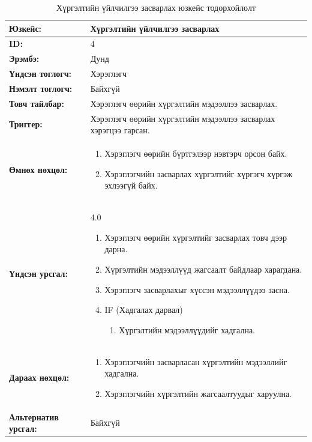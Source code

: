\begin{table}[H]
    \caption{Хүргэлтийн үйлчилгээ засварлах юзкейс тодорхойлолт}
    \begin{tabular}{|l|p{9cm}|}
		\hline
		{\bfseries Юзкейс:} & Хүргэлтийн үйлчилгээ засварлах \\\hline
		{\bfseries ID:} & 4 \\\hline
		{\bfseries Эрэмбэ:} & Дунд \\\hline
		{\bfseries Үндсэн тоглогч:} & Хэрэглэгч \\\hline
		{\bfseries Нэмэлт тоглогч:} & Байхгүй \\\hline
		{\bfseries Товч тайлбар:} & Хэрэглэгч өөрийн хүргэлтийн мэдээллээ засварлах.\\\hline
		{\bfseries Триггер:} & Хэрэглэгч өөрийн хүргэлтийн мэдээллээ засварлах хэрэгцээ гарсан. \\\hline
		{\bfseries Өмнөх нөхцөл:} &
		    \begin{enumerate}[nosep]
		        \item Хэрэглэгч өөрийн бүртгэлээр нэвтэрч орсон байх.
		        \item Хэрэглэгчийн засварлах хүргэлтийг хүргэгч хүргэж эхлээгүй байх.
		    \end{enumerate}
		\\\hline
		{\bfseries Үндсэн урсгал:} &
			4.0
			\begin{enumerate}[nosep]
			    \item Хэрэглэгч өөрийн хүргэлтийг засварлах товч дээр дарна.
			    \item Хүргэлтийн мэдээллүүд жагсаалт байдлаар харагдана.
			    \item Хэрэглэгч засварлахыг хүссэн мэдээллүүдээ засна.
				\item IF (Хадгалах дарвал)
				    \begin{enumerate}[nosep]
				        \item Хүргэлтийн мэдээллүүдийг хадгална.
				    \end{enumerate}
			\end{enumerate}
		\\\hline
		{\bfseries Дараах нөхцөл:} &
		    \begin{enumerate}[nosep]
		        \item Хэрэглэгчийн засварласан хүргэлтийн мэдээллийг хадгална.
		        \item Хэрэглэгчийн хүргэлтийн жагсаалтуудыг харуулна.
		    \end{enumerate}
		\\\hline
		{\bfseries Альтернатив урсгал:} & Байхгүй
		\\\hline
    \end{tabular}
\end{table}


